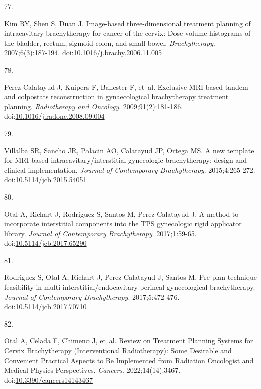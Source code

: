 \documentclass[
  a4paper,
]{scrreprt}
\newlength{\cslhangindent}
\newlength{\csllabelwidth}
\newlength{\cslentryspacingunit} %
\newenvironment{CSLReferences}[2] %
 {%
  \setlength{\parindent}{0pt}
  \ifodd #1
  \let\oldpar\par
  \def\par{\hangindent=\cslhangindent\oldpar}
  \fi
  \setlength{\parskip}{#2\cslentryspacingunit}
 }%
 {}
\newcommand{\CSLLeftMargin}[1]{\parbox[t]{\csllabelwidth}{#1}}
\newcommand{\CSLRightInline}[1]{\parbox[t]{\linewidth - \csllabelwidth}{#1}\break}
\begin{document}
\begin{CSLReferences}{0}{0}
\leavevmode{}%
\CSLLeftMargin{77. }%
\CSLRightInline{Kim RY, Shen S, Duan J. Image-based three-dimensional
treatment planning of intracavitary brachytherapy for cancer of the
cervix: Dose-volume histograms of the bladder, rectum, sigmoid colon,
and small bowel. \emph{Brachytherapy}. 2007;6(3):187-194.
doi:\href{https://doi.org/10.1016/j.brachy.2006.11.005}{10.1016/j.brachy.2006.11.005}}

\leavevmode{}%
\CSLLeftMargin{78. }%
\CSLRightInline{Perez-Calatayud J, Kuipers F, Ballester F, et~al.
Exclusive MRI-based tandem and colpostats reconstruction in
gynaecological brachytherapy treatment planning. \emph{Radiotherapy and
Oncology}. 2009;91(2):181-186.
doi:\href{https://doi.org/10.1016/j.radonc.2008.09.004}{10.1016/j.radonc.2008.09.004}}

\leavevmode{}%
\CSLLeftMargin{79. }%
\CSLRightInline{Villalba SR, Sancho JR, Palacin AO, Calatayud JP, Ortega
MS. A new template for MRI-based intracavitary/interstitial gynecologic
brachytherapy: design and clinical implementation. \emph{Journal of
Contemporary Brachytherapy}. 2015;4:265-272.
doi:\href{https://doi.org/10.5114/jcb.2015.54051}{10.5114/jcb.2015.54051}}

\leavevmode{}%
\CSLLeftMargin{80. }%
\CSLRightInline{Otal A, Richart J, Rodriguez S, Santos M,
Perez-Calatayud J. A method to incorporate interstitial components into
the TPS gynecologic rigid applicator library. \emph{Journal of
Contemporary Brachytherapy}. 2017;1:59-65.
doi:\href{https://doi.org/10.5114/jcb.2017.65290}{10.5114/jcb.2017.65290}}

\leavevmode{}%
\CSLLeftMargin{81. }%
\CSLRightInline{Rodriguez S, Otal A, Richart J, Perez-Calatayud J,
Santos M. Pre-plan technique feasibility in
multi-interstitial/endocavitary perineal gynecological brachytherapy.
\emph{Journal of Contemporary Brachytherapy}. 2017;5:472-476.
doi:\href{https://doi.org/10.5114/jcb.2017.70710}{10.5114/jcb.2017.70710}}

\leavevmode{}%
\CSLLeftMargin{82. }%
\CSLRightInline{Otal A, Celada F, Chimeno J, et~al. Review on Treatment
Planning Systems for Cervix Brachytherapy (Interventional Radiotherapy):
Some Desirable and Convenient Practical Aspects to Be Implemented from
Radiation Oncologist and Medical Physics Perspectives. \emph{Cancers}.
2022;14(14):3467.
doi:\href{https://doi.org/10.3390/cancers14143467}{10.3390/cancers14143467}}


\end{CSLReferences}
\end{document}
